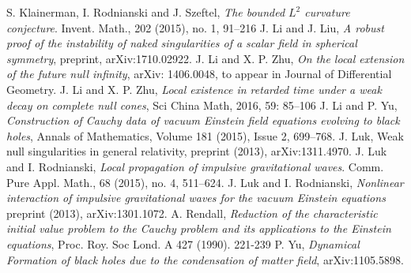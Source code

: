 \documentclass[11pt,reqno]{amsart}
\theoremstyle{definition}
\numberwithin{equation}{section}
\begin{document}
\begin{thebibliography}{99}
 S. Klainerman, I. Rodnianski and J. Szeftel, \textit{The bounded $L^2$ curvature conjecture}. Invent. Math., 202 (2015), no. 1, 91--216
 J. Li and J. Liu, \textit{A robust proof of the instability of naked singularities of a scalar field in spherical symmetry}, preprint, arXiv:1710.02922.
 J. Li and X. P. Zhu, \textit{On the local extension of the future null infinity}, arXiv: 1406.0048, to appear in Journal of Differential Geometry.
 J. Li and X. P. Zhu, \textit{Local existence in retarded time under a weak decay on complete null cones}, Sci China Math, 2016, 59: 85--106
 J. Li and P. Yu, \textit{Construction of Cauchy data of vacuum Einstein field equations evolving to black holes}, Annals of Mathematics, Volume 181 (2015), Issue 2, 699--768.
 J. Luk, Weak null singularities in general relativity, preprint (2013), arXiv:1311.4970.
 J. Luk and I. Rodnianski, \textit{Local propagation of impulsive gravitational waves}. Comm. Pure Appl. Math., 68 (2015), no. 4,
511--624.
 J. Luk and I. Rodnianski, \textit{Nonlinear interaction of impulsive gravitational waves for the vacuum Einstein equations} preprint
(2013), arXiv:1301.1072.
 A. Rendall, \textit{Reduction of the characteristic initial value problem to the Cauchy problem and its applications to the Einstein equations}, Proc. Roy. Soc Lond. A 427 (1990). 221-239
 P. Yu, \textit{Dynamical Formation of black holes due to the condensation of matter field}, arXiv:1105.5898.
\end{thebibliography}
\end{document}
